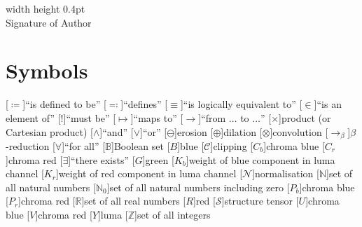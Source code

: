 \documentclass[12pt,a4paper,oneside,openright]{book}
\newcommand{\sig}[1]{\begin{minipage}[t]{\textwidth}
    \begin{center}
      \vspace{2pt}
      \vrule width \textwidth height 0.4pt\\
      \small #1
    \end{center}
  \end{minipage}}
\begin{document}
\begin{CJK}{UTF8}{}
\begin{center}
  \begin{flushright}
    \begin{minipage}[c]{.35\textwidth}
      \sig{Signature of Author}
    \end{minipage}
  \end{flushright}

\end{center}

\tableofcontents

\chapter{Symbols}
\begin{acronym}[AB] %
  [\ensuremath{\coloneqq}]{``is defined to be''}
  [\ensuremath{\eqqcolon}]{``defines''}
  [\ensuremath{\equiv}]{``is logically equivalent to''}
  [\ensuremath{\in}]{``is an element of''}
  [\ensuremath{!}]{``must be''}
  [\ensuremath{\mapsto}]{``maps to''}
  [\ensuremath{\to}]{``from $\ldots$ to $\ldots$''}
  [\ensuremath{\times}]{product (or Cartesian product)}
  [\ensuremath{\wedge}]{``and''}
  [\ensuremath{\vee}]{``or''}
  [\ensuremath{\ominus}]{erosion}
  [\ensuremath{\oplus}]{dilation}
  [\ensuremath{\otimes}]{convolution}
  [\ensuremath{\to_\beta}]{\texorpdfstring{$\beta$}{beta}-reduction}
  [\ensuremath{\forall}]{``for all''}
  [\ensuremath{\mathds{B}}]{Boolean set}
  [\ensuremath{B}]{blue}
  [\ensuremath{\mathcal{C}}]{clipping}
  [\ensuremath{C_b}]{chroma blue}
  [\ensuremath{C_r}]{chroma red}
  [\ensuremath{\exists}]{``there exists''}
  [\ensuremath{G}]{green}
  [\ensuremath{K_b}]{weight of blue component in luma channel}
  [\ensuremath{K_r}]{weight of red component in luma channel}
  [\ensuremath{\mathcal{N}}]{normalisation}
  [\ensuremath{\mathds{N}}]{set of all natural numbers}
  [\ensuremath{\mathds{N}_0}]{set of all natural numbers including zero}
  [\ensuremath{P_b}]{chroma blue}
  [\ensuremath{P_r}]{chroma red}
  [\ensuremath{\mathds{R}}]{set of all real numbers}
  [\ensuremath{R}]{red}
  [\ensuremath{\mathcal{S}}]{structure tensor}
  [\ensuremath{U}]{chroma blue}
  [\ensuremath{V}]{chroma red}
  [\ensuremath{Y}]{luma}
  [\ensuremath{\mathds{Z}}]{set of all integers}
\end{acronym}


\end{CJK}
\end{document}
